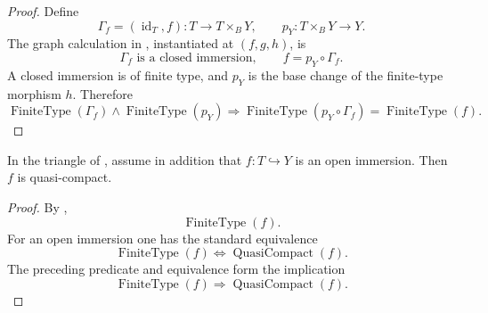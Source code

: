 \begin{proof}
  Define
  \[
    \Gamma_f=(\operatorname{id}_T,f)\colon T\to T\times_BY,
    \qquad p_Y\colon T\times_BY\to Y.
  \]
  The graph calculation in
  , instantiated at
  $(f,g,h)$, is
  \[
    \Gamma_f\text{ is a closed immersion},\qquad f=p_Y\circ\Gamma_f.
  \]
  A closed immersion is of finite type, and $p_Y$ is the base change of the
  finite-type morphism $h$.  Therefore
  \[
    \operatorname{FiniteType}(\Gamma_f)
      \wedge\operatorname{FiniteType}(p_Y)
      \Longrightarrow
    \operatorname{FiniteType}(p_Y\circ\Gamma_f)
      =\operatorname{FiniteType}(f).
  \]
\end{proof}

\begin{corollary}
  \label{lemma:nagata-open-immersion-qc-over-separated-target}

  In the triangle of
  , assume in addition
  that $f\colon T\hookrightarrow Y$ is an open immersion.  Then $f$ is
  quasi-compact.
\end{corollary}

\begin{proof}
  By ,
  \[
    \operatorname{FiniteType}(f).
  \]
  For an open immersion one has the standard equivalence
  \[
    \operatorname{FiniteType}(f)
      \Longleftrightarrow\operatorname{QuasiCompact}(f).
  \]
  The preceding predicate and equivalence form the implication
  \[
    \operatorname{FiniteType}(f)
      \Longrightarrow\operatorname{QuasiCompact}(f).
  \]
\end{proof}

